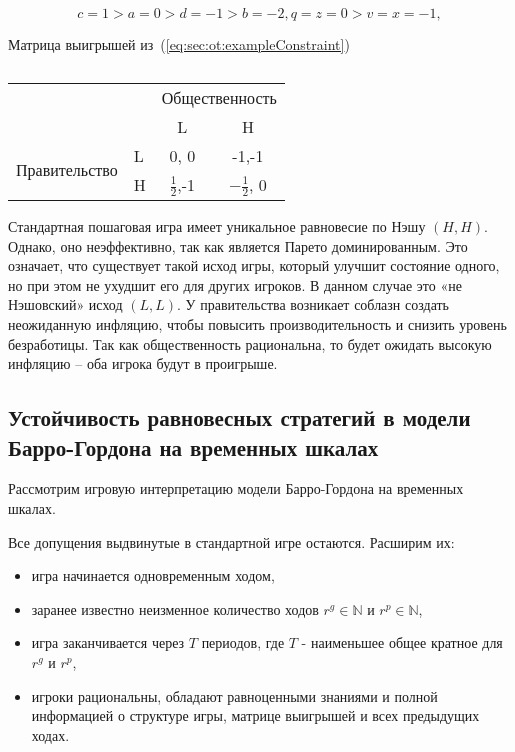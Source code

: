 \begin{equation}
\label{eq:sec:ot:exampleConstraint}
c=1 > a=0 > d=-1 > b=-2, q=z=0 > v=x=-1,
\end{equation}

\begin{table}[h]
	\centering
	
	\caption{}	
	\footnotesize Матрица выигрышей из~(\ref{eq:sec:ot:exampleConstraint})\\
	\normalsize
\begin{tabular}{|l|l|c|c|}
	\hline
	\multicolumn{2}{|l|}{\multirow{2}{*}{}} & \multicolumn{2}{l|}{Общественность} \\ \cline{3-4} 
	\multicolumn{2}{|l|}{}                  & L                & H                \\ \hline
	\multirow{2}{*}{Правительство}    & L   & 0, 0             & -1,-1            \\ \cline{2-4} 
	& H   & $\frac{1}{2}$,-1             & $-\frac{1}{2}$, 0            \\ \hline
\end{tabular}
		
	\label{table:sec:ot:real}
\end{table}


Стандартная пошаговая игра имеет уникальное равновесие по Нэшу $(H,H)$. Однако, оно неэффективно, так как является Парето доминированным. Это означает, что существует такой исход игры, который улучшит состояние одного, но при этом не ухудшит его для других игроков. В данном случае это «не Нэшовский» исход $(L,L)$.  У правительства возникает соблазн создать неожиданную инфляцию, чтобы повысить производительность и снизить уровень безработицы. Так как общественность рациональна, то будет ожидать высокую инфляцию – оба игрока будут в проигрыше. 


\subsection{Устойчивость равновесных стратегий в модели Барро-Гордона на
	временных шкалах} 

Рассмотрим игровую интерпретацию модели Барро-Гордона на временных шкалах.

Все допущения выдвинутые в стандартной игре остаются. Расширим их:
\begin{itemize}
	\item игра начинается одновременным ходом, 
	\item заранее известно неизменное количество ходов $r^g \in \mathbb{N}$ и $r^p \in \mathbb{N}$,
	\item игра заканчивается через $T$ периодов, где $T$ - наименьшее общее кратное для $r^g$ и $r^p$,
	\item игроки рациональны, обладают равноценными знаниями и полной информацией о структуре игры, матрице выигрышей и всех предыдущих ходах.
\end{itemize}

